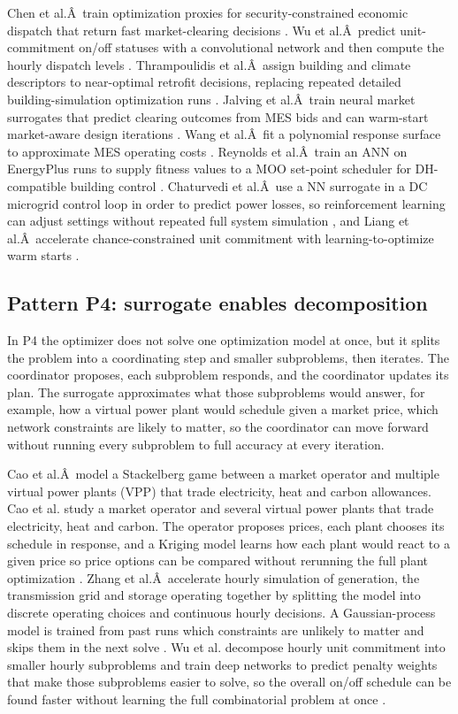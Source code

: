 Chen et al.Â~train optimization proxies for security-constrained economic
dispatch that return fast market-clearing decisions
\cite{Chen2022,Chen20244723}. Wu et al.Â~predict unit-commitment on/off
statuses with a convolutional network and then compute the hourly
dispatch levels \cite{Wu2022231}. Thrampoulidis et al.Â~assign building and
climate descriptors to near-optimal retrofit decisions, replacing
repeated detailed building-simulation optimization runs
\cite{Thrampoulidis2021}. Jalving et al.Â~train neural market surrogates that
predict clearing outcomes from MES bids and can warm-start market-aware
design iterations \cite{Jalving2023}. Wang et al.Â~fit a polynomial response
surface to approximate MES operating costs \cite{Wang2020202933}. Reynolds
et al.Â~train an ANN on EnergyPlus runs to supply fitness values to a MOO
set-point scheduler for DH-compatible building control
\cite{Reynolds2017704}. Chaturvedi et al.Â~use a NN surrogate in a DC
microgrid control loop in order to predict power losses, so
reinforcement learning can adjust settings without repeated full system
simulation \cite{Chaturvedi2024149}, and Liang et al.Â~accelerate
chance-constrained unit commitment with learning-to-optimize warm starts
\cite{Liang20246508}.

\subsection{Pattern P4: surrogate enables decomposition}
\label{sec:int:decomp}

In P4 the optimizer does not solve one optimization model at once, but
it splits the problem into a coordinating step and smaller subproblems,
then iterates. The coordinator proposes, each subproblem responds, and
the coordinator updates its plan. The surrogate approximates what those
subproblems would answer, for example, how a virtual power plant would
schedule given a market price, which network constraints are likely to
matter, so the coordinator can move forward without running every
subproblem to full accuracy at every iteration.

Cao et al.Â~model a Stackelberg game between a market operator and
multiple virtual power plants (VPP) that trade electricity, heat and
carbon allowances. Cao et al. study a market operator and several
virtual power plants that trade electricity, heat and carbon. The
operator proposes prices, each plant chooses its schedule in response,
and a Kriging model learns how each plant would react to a given price
so price options can be compared without rerunning the full plant
optimization \cite{Cao2023__2}. Zhang et al.Â~accelerate hourly simulation
of generation, the transmission grid and storage operating together by
splitting the model into discrete operating choices and continuous
hourly decisions. A Gaussian-process model is trained from past runs
which constraints are unlikely to matter and skips them in the next
solve \cite{Zhang2025__4}. Wu et al. decompose hourly unit commitment into
smaller hourly subproblems and train deep networks to predict penalty
weights that make those subproblems easier to solve, so the overall
on/off schedule can be found faster without learning the full
combinatorial problem at once \cite{Wu2024391}.


